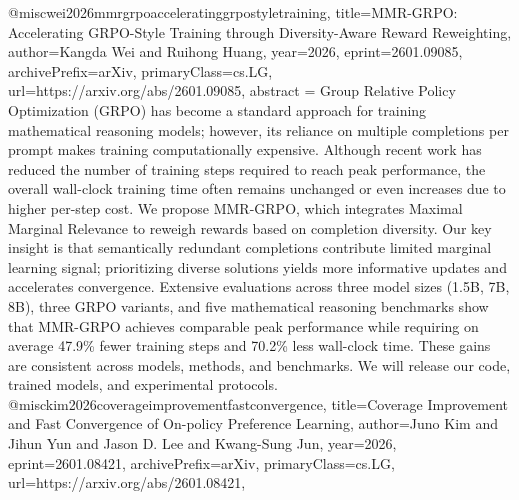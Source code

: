 {}@misc{wei2026mmrgrpoacceleratinggrpostyletraining,
      title={MMR-GRPO: Accelerating GRPO-Style Training through Diversity-Aware Reward Reweighting}, 
      author={Kangda Wei and Ruihong Huang},
      year={2026},
      eprint={2601.09085},
      archivePrefix={arXiv},
      primaryClass={cs.LG},
      url={https://arxiv.org/abs/2601.09085},
      abstract = {Group Relative Policy Optimization (GRPO) has become a standard approach for training mathematical reasoning models; however, its reliance on multiple completions per prompt makes training computationally expensive. Although recent work has reduced the number of training steps required to reach peak performance, the overall wall-clock training time often remains unchanged or even increases due to higher per-step cost. We propose MMR-GRPO, which integrates Maximal Marginal Relevance to reweigh rewards based on completion diversity. Our key insight is that semantically redundant completions contribute limited marginal learning signal; prioritizing diverse solutions yields more informative updates and accelerates convergence. Extensive evaluations across three model sizes (1.5B, 7B, 8B), three GRPO variants, and five mathematical reasoning benchmarks show that MMR-GRPO achieves comparable peak performance while requiring on average 47.9\% fewer training steps and 70.2\% less wall-clock time. These gains are consistent across models, methods, and benchmarks. We will release our code, trained models, and experimental protocols.}
}@misc{kim2026coverageimprovementfastconvergence,
      title={Coverage Improvement and Fast Convergence of On-policy Preference Learning}, 
      author={Juno Kim and Jihun Yun and Jason D. Lee and Kwang-Sung Jun},
      year={2026},
      eprint={2601.08421},
      archivePrefix={arXiv},
      primaryClass={cs.LG},
      url={https://arxiv.org/abs/2601.08421},
}

